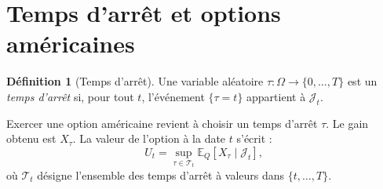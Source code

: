 \documentclass[12pt,a4paper]{article}
\numberwithin{equation}{section}
\theoremstyle{plain} %
\theoremstyle{definition} %
\newtheorem{definition}{Définition}          %
\theoremstyle{remark} %
\theoremstyle{myexample}
\theoremstyle{definition}
\newcommand{\E}{\mathbb{E}}
\begin{document}
\section{Temps d’arrêt et options américaines}

\begin{definition}[Temps d’arrêt]
Une variable aléatoire $\tau : \Omega \to \{0,\dots,T\}$ est un \emph{temps d’arrêt} si,
pour tout $t$, l’événement $\{\tau = t\}$ appartient à $\mathcal{J}_t$.
\end{definition}

Exercer une option américaine revient à choisir un temps d’arrêt $\tau$.  
Le gain obtenu est $X_\tau$.  
La valeur de l’option à la date $t$ s’écrit :
\[
U_t = \sup_{\tau\in\mathcal{T}_t} \E_Q[X_\tau\mid\mathcal{J}_t],
\]
où $\mathcal{T}_t$ désigne l’ensemble des temps d’arrêt à valeurs dans $\{t,\dots,T\}$.
\end{document}
